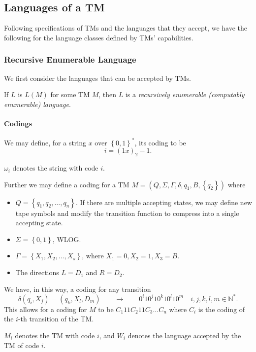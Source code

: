 \subsection{Languages of a TM}
Following specifications of TMs and the languages that they accept, we have the
following for the language classes defined by TMs' capabilities. 
\subsubsection{Recursive Enumerable Language}
We first consider the languages that can be accepted by TMs.

\begin{definition}
  If $L$ is $L(M)$ for some TM $M$, then $L$ is a \textit{recursively enumerable
  (computably enumerable) language}.
\end{definition}

\paragraph{Codings}
We may define, for a string $x$ over $\left\{ 0,1 \right\} ^{*}$, its coding to be
\[i=\left( 1x \right) _2-1.\]
\begin{notation}
  $\omega_i$ denotes the string with code $i$.
\end{notation}

Further we may define a coding for a TM $M=\left( Q,\Sigma,\Gamma,\delta,q_1,B,\left\{ q_2 \right\}  \right)$ where
\begin{itemize}
  \item $Q=\left\{ q_1,q_2,\ldots,q_{n} \right\} $. If there are multiple
    accepting states, we may define new tape symbols and modify the transition function
    to compress into a single accepting state.
  \item $\Sigma=\left\{ 0,1 \right\} $, WLOG.
  \item $\Gamma=\left\{ X_1,X_2,\ldots,X_s \right\} $, where $X_1=0,X_2=1, X_3=B$.
  \item The directions $L=D_1$ and $R=D_2$.
\end{itemize}
We have, in this way, a coding for any transition
\[\delta\left( q_i,X_j \right) =\left( q_k,X_l,D_m \right)\qquad\to\qquad
0^{i}10^{j}10^{k}10^{l}10^{m}\quad i,j,k,l,m\in \mathbb{N}^*.\]
This allows for a coding for $M$ to be $C_1 11 C_2 11 C_3\ldots C_{n}$ where
$C_i$ is the coding of the $i$-th transition of the TM.
\begin{notation}
  $M_i$ denotes the TM with code $i$, and $W_i$ denotes the language accepted
  by the TM of code $i$.
\end{notation}

